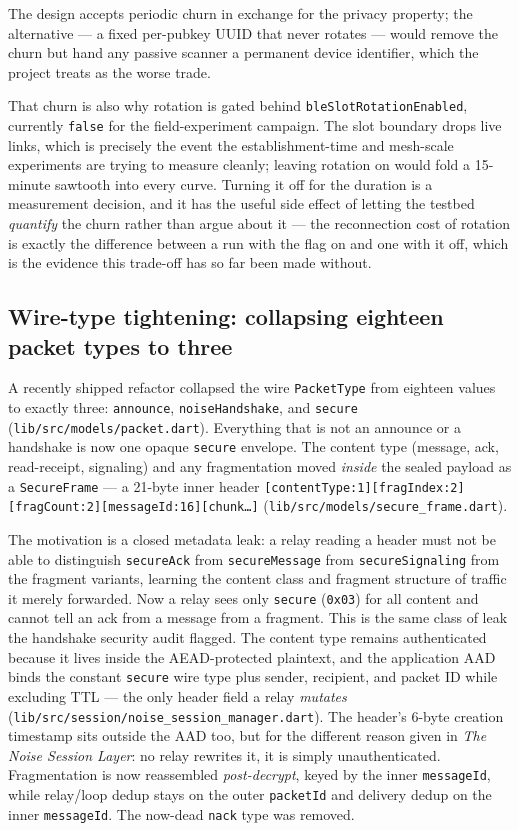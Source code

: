 \documentclass[11pt]{report}
\newcommand{\code}[1]{\texttt{\small #1}}
\begin{document}
The design accepts periodic churn in exchange for the privacy property; the alternative --- a fixed per-pubkey UUID that never rotates --- would remove the churn but hand any passive scanner a permanent device identifier, which the project treats as the worse trade.

That churn is also why rotation is gated behind \code{bleSlotRotationEnabled}, currently \code{false} for the field-experiment campaign. The slot boundary drops live links, which is precisely the event the establishment-time and mesh-scale experiments are trying to measure cleanly; leaving rotation on would fold a 15-minute sawtooth into every curve. Turning it off for the duration is a measurement decision, and it has the useful side effect of letting the testbed \emph{quantify} the churn rather than argue about it --- the reconnection cost of rotation is exactly the difference between a run with the flag on and one with it off, which is the evidence this trade-off has so far been made without.

\subsection{Wire-type tightening: collapsing eighteen packet types to three}

A recently shipped refactor collapsed the wire \code{PacketType} from eighteen values to exactly three: \code{announce}, \code{noiseHandshake}, and \code{secure} (\code{lib/src/models/packet.dart}). Everything that is not an announce or a handshake is now one opaque \code{secure} envelope. The content type (message, ack, read-receipt, signaling) and any fragmentation moved \emph{inside} the sealed payload as a \code{SecureFrame} --- a 21-byte inner header \code{[contentType:1][fragIndex:2][fragCount:2][messageId:16][chunk\ldots]} (\code{lib/src/models/secure_frame.dart}).

The motivation is a closed metadata leak: a relay reading a header must not be able to distinguish \code{secureAck} from \code{secureMessage} from \code{secureSignaling} from the fragment variants, learning the content class and fragment structure of traffic it merely forwarded. Now a relay sees only \code{secure} (\code{0x03}) for all content and cannot tell an ack from a message from a fragment. This is the same class of leak the handshake security audit flagged. The content type remains authenticated because it lives inside the AEAD-protected plaintext, and the application AAD binds the constant \code{secure} wire type plus sender, recipient, and packet ID while excluding TTL --- the only header field a relay \emph{mutates} (\code{lib/src/session/noise_session_manager.dart}). The header's 6-byte creation timestamp sits outside the AAD too, but for the different reason given in \emph{The Noise Session Layer}: no relay rewrites it, it is simply unauthenticated. Fragmentation is now reassembled \emph{post-decrypt}, keyed by the inner \code{messageId}, while relay/loop dedup stays on the outer \code{packetId} and delivery dedup on the inner \code{messageId}. The now-dead \code{nack} type was removed.
\end{document}
